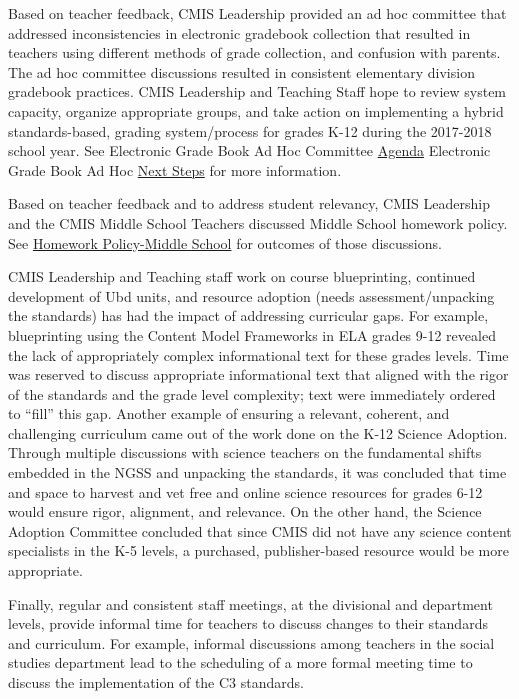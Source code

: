 \documentclass{report}
\begin{document}
\begin{findings}
Based on teacher feedback, CMIS Leadership provided an ad hoc committee that addressed inconsistencies in electronic gradebook collection that resulted in teachers using different methods of grade collection, and confusion with parents. The ad hoc committee discussions resulted in consistent elementary division gradebook practices. CMIS Leadership and Teaching Staff hope to review system capacity, organize appropriate groups, and take action on implementing a hybrid standards-based, grading system/process for grades K-12 during the 2017-2018 school year. See Electronic Grade Book Ad Hoc Committee \href{https://docs.google.com/a/cmis.ac.th/document/d/1Zj6EgudBwl-ifOguUDN-bHM8avJbFEZEFGwERJfVRbk/edit?usp=sharing}{Agenda}  Electronic Grade Book Ad Hoc \href{https://docs.google.com/a/cmis.ac.th/document/d/1087Xf0H6-vlwR7qYB2zhzWwBThQR4PQKffTVP3CaEis/edit?usp=sharing}{Next Steps} for more information. 

Based on teacher feedback and to address student relevancy, CMIS Leadership and the CMIS Middle School Teachers discussed Middle School homework policy. See \href{https://docs.google.com/a/cmis.ac.th/document/d/16b9QZYYXoRK-nJdFtCsW13NB9IwzAu8rlmTMnJ6usdo/edit?usp=sharing}{Homework Policy-Middle School} for outcomes of those discussions. 

CMIS Leadership and Teaching staff work on course blueprinting, continued development of Ubd units, and resource adoption (needs assessment/unpacking the standards) has had the impact of addressing curricular gaps. For example, blueprinting using the Content Model Frameworks in ELA grades 9-12 revealed the lack of appropriately complex informational text for these grades levels. Time was reserved to discuss appropriate informational text that aligned with the rigor of the standards and the grade level complexity; text were immediately ordered to “fill” this gap. Another example of ensuring a relevant, coherent, and challenging curriculum came out of the work done on the K-12 Science Adoption. Through multiple discussions with science teachers on the fundamental shifts embedded in the NGSS and unpacking the standards, it was concluded that time and space to harvest and vet free and online science resources for grades 6-12 would ensure rigor, alignment, and relevance. On the other hand, the Science Adoption Committee concluded that since CMIS did not have any science content specialists in the K-5 levels, a purchased, publisher-based resource would be more appropriate. 

Finally, regular and consistent staff meetings, at the divisional and department levels, provide informal time for teachers to discuss changes to their standards and curriculum. For example, informal discussions among teachers in the social studies department lead to the scheduling of a more formal meeting time to discuss the implementation of the C3 standards.


\end{findings}
\end{document}
